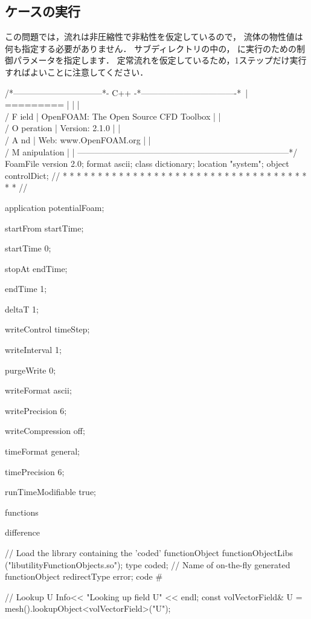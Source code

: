 \subsection{ケースの実行}
\label{ssec:3.1.5}
この問題では，流れは非圧縮性で非粘性を仮定しているので，
流体の物性値は何も指定する必要がありません．
サブディレクトリの中の，
に実行のための制御パラメータを指定します．
定常流れを仮定しているため，1ステップだけ実行すればよいことに注意してください．
\begin{OFverbatim}
/*--------------------------------*- C++ -*----------------------------------*\
| =========                 |                                                 |
| \\      /  F ield         | OpenFOAM: The Open Source CFD Toolbox           |
|  \\    /   O peration     | Version:  2.1.0                                 |
|   \\  /    A nd           | Web:      www.OpenFOAM.org                      |
|    \\/     M anipulation  |                                                 |
\*---------------------------------------------------------------------------*/
FoamFile
{
    version     2.0;
    format      ascii;
    class       dictionary;
    location    "system";
    object      controlDict;
}
// * * * * * * * * * * * * * * * * * * * * * * * * * * * * * * * * * * * * * //

application     potentialFoam;

startFrom       startTime;

startTime       0;

stopAt          endTime;

endTime         1;

deltaT          1;

writeControl    timeStep;

writeInterval   1;

purgeWrite      0;

writeFormat     ascii;

writePrecision  6;

writeCompression off;

timeFormat      general;

timePrecision   6;

runTimeModifiable true;

functions
{
    difference
    {
        // Load the library containing the 'coded' functionObject
        functionObjectLibs ("libutilityFunctionObjects.so");
        type coded;
        // Name of on-the-fly generated functionObject
        redirectType error;
        code
        #{
            // Lookup U
            Info<< "Looking up field U\n" << endl;
            const volVectorField& U = mesh().lookupObject<volVectorField>("U");

}}}
\end{OFverbatim}

